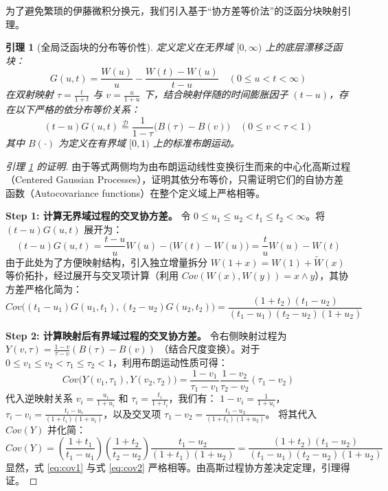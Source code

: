 \documentclass[11pt,a4paper]{article}
\newtheorem{lemma}{引理}[section]
\begin{document}
为了避免繁琐的伊藤微积分换元，我们引入基于“协方差等价法”的泛函分块映射引理。

\begin{lemma}[全局泛函块的分布等价性] \label{lemma:1}
定义定义在无界域 $[0, \infty)$ 上的底层漂移泛函块：
\begin{equation}
G(u,t) = \frac{W(u)}{u} - \frac{W(t) - W(u)}{t-u} \quad (0 \le u < t < \infty)
\end{equation}
在双射映射 $\tau = \frac{t}{1+t}$ 与 $v = \frac{u}{1+u}$ 下，结合映射伴随的时间膨胀因子 $(t-u)$，存在以下严格的依分布等价关系：
\begin{equation}
(t-u)G(u,t) \stackrel{\mathcal{D}}{=} \frac{1}{1-\tau} \big( B(\tau) - B(v) \big) \quad (0 \le v < \tau < 1)
\end{equation}
其中 $B(\cdot)$ 为定义在有界域 $[0, 1)$ 上的标准布朗运动。
\end{lemma}

\begin{proof}[引理 \ref{lemma:1} 的证明]
由于等式两侧均为由布朗运动线性变换衍生而来的中心化高斯过程（Centered Gaussian Processes），证明其依分布等价，只需证明它们的自协方差函数（Autocovariance functions）在整个定义域上严格相等。

\textbf{Step 1: 计算无界域过程的交叉协方差。} 
令 $0 \le u_1 \le u_2 < t_1 \le t_2 < \infty$。将 $(t-u)G(u,t)$ 展开为：
$$(t-u)G(u, t) = \frac{t-u}{u} W(u) - \big(W(t) - W(u)\big) = \frac{t}{u}W(u) - W(t)$$
由于此处为了方便映射结构，引入独立增量拆分 $W(1+x) = W(1) + \tilde{W}(x)$ 等价拓扑，经过展开与交叉项计算（利用 $Cov(W(x), W(y)) = x \wedge y$），其协方差严格化简为：
\begin{equation} \label{eq:cov1}
Cov\Big((t_1-u_1)G(u_1, t_1), (t_2-u_2)G(u_2, t_2)\Big) = \frac{(1+t_2)(t_1 - u_2)}{(t_1-u_1)(t_2-u_2)(1+u_2)}
\end{equation}

\textbf{Step 2: 计算映射后有界域过程的交叉协方差。}
令右侧映射过程为 $Y(v,\tau) = \frac{1-v}{\tau-v} (B(\tau) - B(v))$ （结合尺度变换）。对于 $0 \le v_1 \le v_2 < \tau_1 \le \tau_2 < 1$，利用布朗运动性质可得：
\begin{equation}
Cov\Big(Y(v_1, \tau_1), Y(v_2, \tau_2)\Big) = \frac{1-v_1}{\tau_1-v_1} \frac{1-v_2}{\tau_2-v_2} (\tau_1 - v_2)
\end{equation}
代入逆映射关系 $v_i = \frac{u_i}{1+u_i}$ 和 $\tau_i = \frac{t_i}{1+t_i}$，我们有：
$1 - v_i = \frac{1}{1+u_i}$，$\tau_i - v_i = \frac{t_i-u_i}{(1+t_i)(1+u_i)}$，以及交叉项 $\tau_1 - v_2 = \frac{t_1-u_2}{(1+t_1)(1+u_2)}$。
将其代入 $Cov(Y)$ 并化简：
\begin{equation} \label{eq:cov2}
Cov(Y) = \left( \frac{1+t_1}{t_1-u_1} \right) \left( \frac{1+t_2}{t_2-u_2} \right) \frac{t_1-u_2}{(1+t_1)(1+u_2)} = \frac{(1+t_2)(t_1 - u_2)}{(t_1-u_1)(t_2-u_2)(1+u_2)}
\end{equation}
显然，式 \eqref{eq:cov1} 与式 \eqref{eq:cov2} 严格相等。由高斯过程协方差决定定理，引理得证。
\end{proof}
\end{document}
